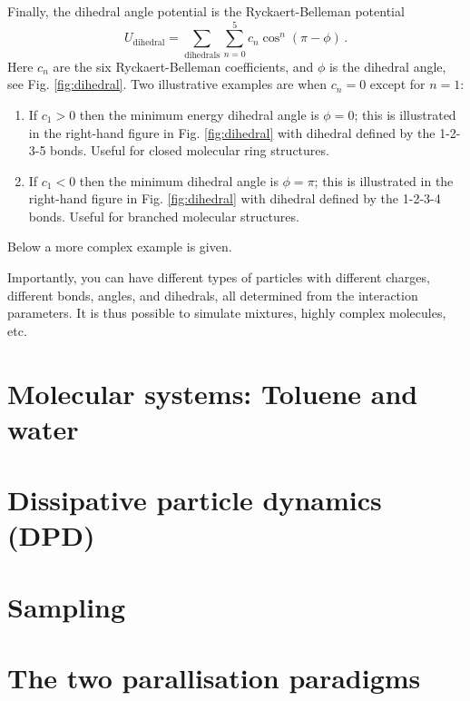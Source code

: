 \documentclass[11pt]{article}
\begin{document}
Finally, the dihedral angle potential is the Ryckaert-Belleman potential 
\begin{equation}
  U_\mathrm{dihedral}=\sum_{\mathrm{dihedrals}} \sum_{n=0}^5 c_n
  \cos^n(\pi-\phi)
   \, . 
\end{equation}
Here $c_n$ are the six Ryckaert-Belleman coefficients, and $\phi$ is the
dihedral angle, see Fig. \ref{fig:dihedral}. Two illustrative 
examples are when $c_n = 0$ except for $n=1$:
\begin{enumerate}
\item If $c_1 > 0$ then the minimum energy dihedral angle is $\phi = 0$; this is
  illustrated in the right-hand figure in Fig. \ref{fig:dihedral} with dihedral
  defined by the 1-2-3-5 bonds. Useful for closed molecular ring structures.
\item If $c_1 < 0$ then the minimum dihedral angle is $\phi = \pi$; this is
  illustrated in the right-hand figure in Fig. \ref{fig:dihedral} with
  dihedral defined by the 1-2-3-4 bonds. Useful for branched molecular
  structures. 
\end{enumerate}
Below a more complex example is given.

Importantly, you can have different types of particles with different charges,
different bonds, angles, and dihedrals, all determined from the interaction
parameters. It is thus possible to simulate mixtures, highly complex molecules,
etc. 

\section{Molecular systems: Toluene and water}

\section{Dissipative particle dynamics (DPD)}
\section{Sampling}
\section{The two parallisation paradigms}
\end{document}
